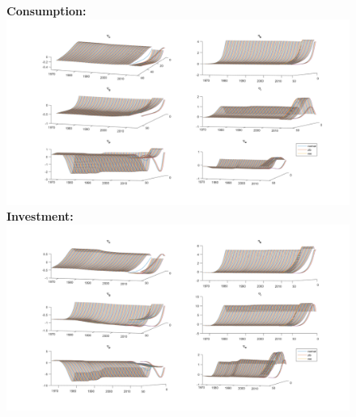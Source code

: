 \documentclass[12pt,reqno]{article}
\numberwithin{equation}{section}
\begin{document}
\begin{figure}[H]
\textbf{Consumption:}\\
\includegraphics[scale=0.5]{MSV_impresp_cons_3d.pdf}
\textbf{Investment:}\\
\includegraphics[scale=0.5]{MSV_impresp_inv_3d.pdf}

\end{figure}
\end{document}

